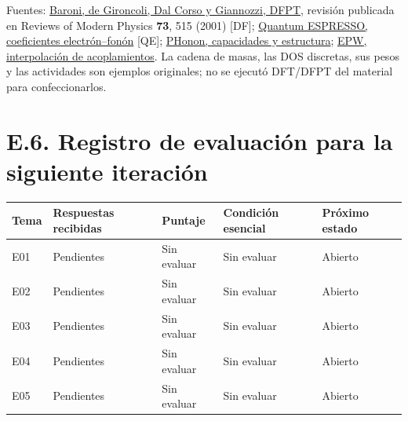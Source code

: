 \documentclass[
  spanish,
  10pt,
  a4paper,
]{article}
\newcounter{none} %
\begin{document}
Fuentes: \href{https://arxiv.org/abs/cond-mat/0012092}{Baroni, de
Gironcoli, Dal Corso y Giannozzi, DFPT}, revisión publicada en Reviews
of Modern Physics \textbf{73}, 515 (2001) {[}DF{]};
\href{https://www.quantum-espresso.org/Doc/ph_user_guide/node19.html}{Quantum
ESPRESSO, coeficientes electrón--fonón} {[}QE{]};
\href{https://www.quantum-espresso.org/Doc/ph_user_guide/node5.html}{PHonon,
capacidades y estructura}; \href{https://arxiv.org/abs/1005.4418}{EPW,
interpolación de acoplamientos}. La cadena de masas, las DOS discretas,
sus pesos y las actividades son ejemplos originales; no se ejecutó
DFT/DFPT del material para confeccionarlos.

\section{E.6. Registro de evaluación para la siguiente
iteración}\label{e.6.-registro-de-evaluaciuxf3n-para-la-siguiente-iteraciuxf3n}

{\def\LTcaptype{none} %
\begin{longtable}[]{@{}
  >{\raggedright\arraybackslash}p{}
  >{\raggedright\arraybackslash}p{}
  >{\raggedright\arraybackslash}p{}
  >{\raggedright\arraybackslash}p{}
  >{\raggedright\arraybackslash}p{}@{}}
\toprule\noalign{}
\begin{minipage}[b]{\linewidth}\raggedright
Tema
\end{minipage} & \begin{minipage}[b]{\linewidth}\raggedright
Respuestas recibidas
\end{minipage} & \begin{minipage}[b]{\linewidth}\raggedright
Puntaje
\end{minipage} & \begin{minipage}[b]{\linewidth}\raggedright
Condición esencial
\end{minipage} & \begin{minipage}[b]{\linewidth}\raggedright
Próximo estado
\end{minipage} \\
\midrule\noalign{}
\endhead
\bottomrule\noalign{}
\endlastfoot
E01 & Pendientes & Sin evaluar & Sin evaluar & Abierto \\
E02 & Pendientes & Sin evaluar & Sin evaluar & Abierto \\
E03 & Pendientes & Sin evaluar & Sin evaluar & Abierto \\
E04 & Pendientes & Sin evaluar & Sin evaluar & Abierto \\
E05 & Pendientes & Sin evaluar & Sin evaluar & Abierto \\
\end{longtable}
}
\end{document}
